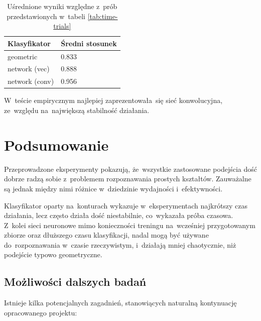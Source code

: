 \documentclass[11pt,a4paper]{article}
\begin{document}
\begin{table}[H]
    \centering
    \begin{tabularx}{0.6\textwidth}{|l|Y|}
        \hline
        \textbf{Klasyfikator} & \textbf{Średni stosunek} \\
        \hline
        geometric & 0.833 \\
        \hline
        network (vec) & 0.888 \\
        \hline
        network (conv) & 0.956 \\
        \hline
    \end{tabularx}
    \caption{Uśrednione wyniki względne z~prób przedstawionych w~tabeli \ref{tab:time-trials}}
    \label{tab:average-ratio}
\end{table}

W~teście empirycznym najlepiej zaprezentowała~się sieć konwolucyjna, ze~względu na~największą stabilność działania.

\section{Podsumowanie}

Przeprowadzone eksperymenty pokazują, że~wszystkie zastosowane podejścia dość dobrze radzą sobie z~problemem rozpoznawania prostych kształtów.
Zauważalne są jednak między nimi różnice w~dziedzinie wydajności i~efektywności.

Klasyfikator oparty na~konturach wykazuje w~eksperymentach najkrótszy czas działania, lecz często działa dość niestabilnie, co~wykazała próba czasowa.
Z~kolei sieci neuronowe mimo konieczności treningu na~wcześniej przygotowanym zbiorze oraz dłuższego czasu klasyfikacji, nadal mogą być używane do~rozpoznawania w~czasie rzeczywistym, i~działają mniej chaotycznie, niż podejście typowo geometryczne.

\subsection{Możliwości dalszych badań}

Istnieje kilka potencjalnych zagadnień, stanowiących naturalną kontynuację opracowanego projektu:
\end{document}
